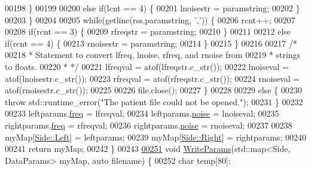 \begin{DoxyCode}
00198                 \}
00199 
00200                 \textcolor{keywordflow}{else} \textcolor{keywordflow}{if}(lcnt == 4) \{
00201                     lnoisestr = paramstring;
00202                 \}
00203             \}
00204 
00205             \textcolor{keywordflow}{while}(getline(rss,paramstring, \textcolor{charliteral}{','})) \{
00206                 rcnt++;
00207 
00208                 \textcolor{keywordflow}{if}(rcnt == 3) \{
00209                     rfreqstr = paramstring;
00210                 \}
00211 
00212                 \textcolor{keywordflow}{else} \textcolor{keywordflow}{if}(rcnt == 4) \{
00213                     rnoisestr = paramstring;
00214                 \}
00215             \}
00216 
00217             \textcolor{comment}{/*}
00218 \textcolor{comment}{             * Statement to convert lfreq, lnoise, rfreq, and rnoise from}
00219 \textcolor{comment}{             * strings to floats.}
00220 \textcolor{comment}{             * */}
00221             lfreqval = atof(lfreqstr.c\_str());
00222             lnoiseval = atof(lnoisestr.c\_str());
00223             rfreqval = atof(rfreqstr.c\_str());
00224             rnoiseval = atof(rnoisestr.c\_str());
00225 
00226             file.close();
00227         \}
00228 
00229         \textcolor{keywordflow}{else} \{
00230             \textcolor{keywordflow}{throw} std::runtime\_error(\textcolor{stringliteral}{"The patient file could not be opened."});
00231         \}
00232 
00233         leftparams.\hyperlink{structDataParams_a12566e017407647bc8287d62554ad3fb}{freq} = lfreqval;
00234         leftparams.\hyperlink{structDataParams_a4efd1d2231c6fa7c878c9d5e1650738f}{noise} = lnoiseval;
00235         rightparams.\hyperlink{structDataParams_a12566e017407647bc8287d62554ad3fb}{freq} = rfreqval;
00236         rightparams.\hyperlink{structDataParams_a4efd1d2231c6fa7c878c9d5e1650738f}{noise} = rnoiseval;
00237 
00238         myMap[\hyperlink{namespacevaso_a77c5d9704657d49d456f691ddd8abf7ca945d5e233cf7d6240f6b783b36a374ff}{Side::Left}] = leftparams;
00239         myMap[\hyperlink{namespacevaso_a77c5d9704657d49d456f691ddd8abf7ca92b09c7c48c520c3c55e497875da437c}{Side::Right}] = rightparams;
00240 
00241         \textcolor{keywordflow}{return} myMap;
00242     \}
00243 
\hypertarget{fileio_8hpp_source_l00251}{}\hyperlink{namespacevaso_ac272f5c7d73f350442d4657ef0258021}{00251}     \textcolor{keywordtype}{void} \hyperlink{namespacevaso_ac272f5c7d73f350442d4657ef0258021}{WriteParams}(std::map<Side, DataParams> myMap, \textcolor{keyword}{auto} filename) \{
00252         \textcolor{keywordtype}{char} temp[80];

\end{DoxyCode}

